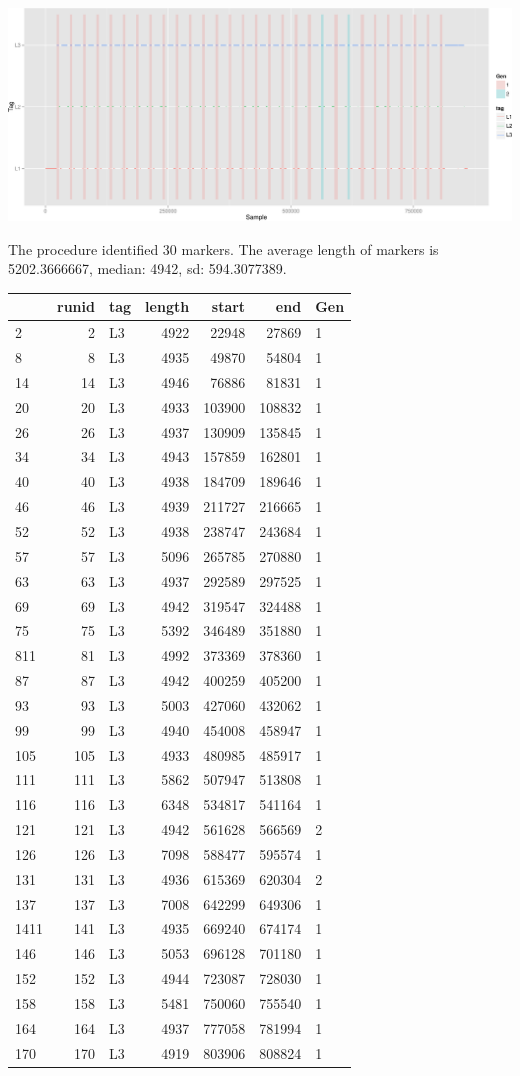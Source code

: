 \documentclass[]{article}
\begin{document}
\includegraphics{AnalysisProcedure_files/figure-latex/runs_with_markers-1.pdf}

The procedure identified 30 markers. The average length of markers is
5202.3666667, median: 4942, sd: 594.3077389.

\begin{longtable}[c]{@{}lrlrrrl@{}}
\toprule
& runid & tag & length & start & end & Gen\tabularnewline
\midrule
\endhead
2 & 2 & L3 & 4922 & 22948 & 27869 & 1\tabularnewline
8 & 8 & L3 & 4935 & 49870 & 54804 & 1\tabularnewline
14 & 14 & L3 & 4946 & 76886 & 81831 & 1\tabularnewline
20 & 20 & L3 & 4933 & 103900 & 108832 & 1\tabularnewline
26 & 26 & L3 & 4937 & 130909 & 135845 & 1\tabularnewline
34 & 34 & L3 & 4943 & 157859 & 162801 & 1\tabularnewline
40 & 40 & L3 & 4938 & 184709 & 189646 & 1\tabularnewline
46 & 46 & L3 & 4939 & 211727 & 216665 & 1\tabularnewline
52 & 52 & L3 & 4938 & 238747 & 243684 & 1\tabularnewline
57 & 57 & L3 & 5096 & 265785 & 270880 & 1\tabularnewline
63 & 63 & L3 & 4937 & 292589 & 297525 & 1\tabularnewline
69 & 69 & L3 & 4942 & 319547 & 324488 & 1\tabularnewline
75 & 75 & L3 & 5392 & 346489 & 351880 & 1\tabularnewline
811 & 81 & L3 & 4992 & 373369 & 378360 & 1\tabularnewline
87 & 87 & L3 & 4942 & 400259 & 405200 & 1\tabularnewline
93 & 93 & L3 & 5003 & 427060 & 432062 & 1\tabularnewline
99 & 99 & L3 & 4940 & 454008 & 458947 & 1\tabularnewline
105 & 105 & L3 & 4933 & 480985 & 485917 & 1\tabularnewline
111 & 111 & L3 & 5862 & 507947 & 513808 & 1\tabularnewline
116 & 116 & L3 & 6348 & 534817 & 541164 & 1\tabularnewline
121 & 121 & L3 & 4942 & 561628 & 566569 & 2\tabularnewline
126 & 126 & L3 & 7098 & 588477 & 595574 & 1\tabularnewline
131 & 131 & L3 & 4936 & 615369 & 620304 & 2\tabularnewline
137 & 137 & L3 & 7008 & 642299 & 649306 & 1\tabularnewline
1411 & 141 & L3 & 4935 & 669240 & 674174 & 1\tabularnewline
146 & 146 & L3 & 5053 & 696128 & 701180 & 1\tabularnewline
152 & 152 & L3 & 4944 & 723087 & 728030 & 1\tabularnewline
158 & 158 & L3 & 5481 & 750060 & 755540 & 1\tabularnewline
164 & 164 & L3 & 4937 & 777058 & 781994 & 1\tabularnewline
170 & 170 & L3 & 4919 & 803906 & 808824 & 1\tabularnewline
\bottomrule
\end{longtable}
\end{document}
